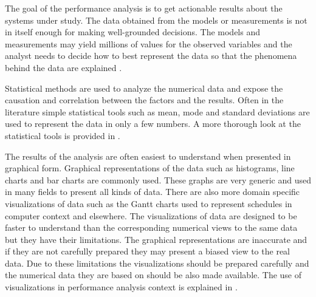 The goal of the performance analysis is to get actionable results about the systems under study. The data obtained from the models or measurements is not in itself enough for making well-grounded decisions. The models and measurements may yield millions of values for the observed variables and the analyst needs to decide how to best represent the data so that the phenomena behind the data are explained \cite{jain1991art}.

Statistical methods are used to analyze the numerical data and expose the causation and correlation between the factors and the results. Often in the literature simple statistical tools such as mean, mode and standard deviations are used to represent the data in only a few numbers. A more thorough look at the statistical tools is provided in \cite{jain1991art}.  

The results of the analysis are often easiest to understand when presented in graphical form. Graphical representations of the data such as histograms, line charts and bar charts are commonly used. These graphs are very generic and used in many fields to present all kinds of data. There are also more domain specific visualizations of data such as the Gantt charts used to represent schedules in computer context and elsewhere. The visualizations of data are designed to be faster to understand than the corresponding numerical views to the same data but they have their limitations. The graphical representations are inaccurate and if they are not carefully prepared they may present a biased view to the real data. Due to these limitations the visualizations should be prepared carefully and the numerical data they are based on should be also made available. The use of visualizations in performance analysis context is explained in \cite{jain1991art}. 

